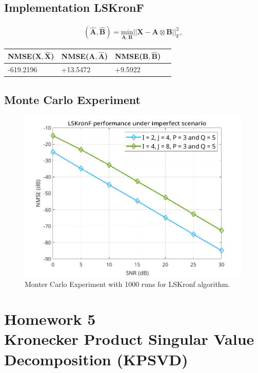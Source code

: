 \documentclass[a4paper,10pt]{article}
\begin{document}
    \subsection*{Implementation LSKronF}

    \begin{align}
        \left(\hat{\boldsymbol{A}}, \hat{\boldsymbol{B}}\right) = \underset{\boldsymbol{A}, \boldsymbol{B}}{\text{min}} \left|\left| \boldsymbol{X} - \boldsymbol{A} \otimes \boldsymbol{B} \right|\right|^2_{\text{F}},
    \end{align}

    \begin{table}[ht!]
        \centering
        \begin{tabular}{|l|l|l|l|}
        \hline
        NMSE($\boldsymbol{X}, \boldsymbol{\hat{X}}$) & NMSE($\boldsymbol{A}, \boldsymbol{\hat{A}}$) & NMSE($\boldsymbol{B}, \boldsymbol{\hat{B}}$) \\ \hline
        -619.2196 & +13.5472 & +9.5922 \\ \hline
        \end{tabular}
    \end{table}

    \subsection*{Monte Carlo Experiment}

    \begin{figure}[ht!]
        \centering 
        \includegraphics[width=0.75\linewidth]{figs/hw4.png} \par 
        \caption{Monter Carlo Experiment with 1000 runs for LSKronf algorithm.}
        \label{fig:hw4} 
    \end{figure}

\newpage
\section*{Homework 5 \\ Kronecker Product Singular Value Decomposition (KPSVD)}
\end{document}
